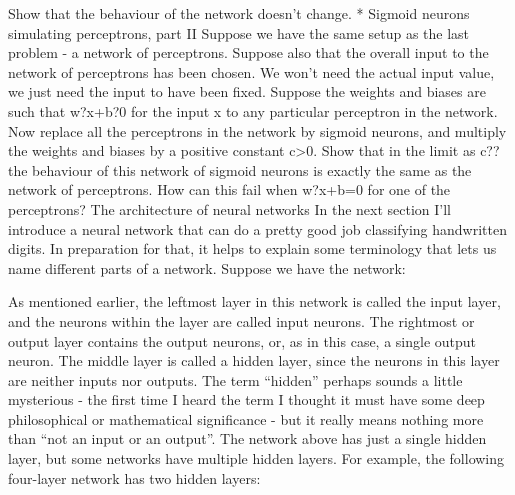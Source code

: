 Show that the behaviour of the network doesn't change.
*  Sigmoid neurons simulating perceptrons, part II Suppose we have the same setup as the last problem - a network of perceptrons. Suppose also that the overall input to the network of perceptrons has been chosen. We won't need the actual input value, we just need the input to have been fixed. Suppose the weights and biases are such that w?x+b?0 for the input x to any particular perceptron in the network. Now replace all the perceptrons in the network by sigmoid neurons, and multiply the weights and biases by a positive constant c>0. Show that in the limit as c?? the behaviour of this network of sigmoid neurons is exactly the same as the network of perceptrons. How can this fail when w?x+b=0 for one of the perceptrons? 
The architecture of neural networks
In the next section I'll introduce a neural network that can do a pretty good job classifying handwritten digits. In preparation for that, it helps to explain some terminology that lets us name different parts of a network. Suppose we have the network: 

As mentioned earlier, the leftmost layer in this network is called the input layer, and the neurons within the layer are called input neurons. The rightmost or output layer contains the output neurons, or, as in this case, a single output neuron. The middle layer is called a hidden layer, since the neurons in this layer are neither inputs nor outputs. The term ``hidden'' perhaps sounds a little mysterious - the first time I heard the term I thought it must have some deep philosophical or mathematical significance - but it really means nothing more than ``not an input or an output''. The network above has just a single hidden layer, but some networks have multiple hidden layers. For example, the following four-layer network has two hidden layers: 

